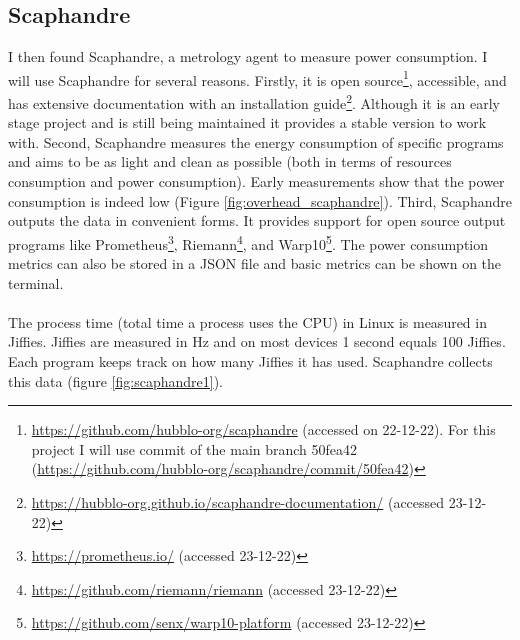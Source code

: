 \documentclass[../thesis.tex]{subfiles}
\begin{document}
\subsection{Scaphandre}
I then found Scaphandre, a metrology agent to measure power consumption. I will use Scaphandre for several reasons. Firstly, it is open source\footnote{\url{https://github.com/hubblo-org/scaphandre} (accessed on 22-12-22). For this project I will use commit of the main branch 50fea42 (\url{https://github.com/hubblo-org/scaphandre/commit/50fea42})}, accessible, and has extensive documentation with an installation guide\footnote{\url{https://hubblo-org.github.io/scaphandre-documentation/} (accessed 23-12-22)}. Although it is an early stage project and is still being maintained it provides a stable version to work with. Second, Scaphandre measures the energy consumption of specific programs and aims to be as light and clean as possible (both in terms of resources consumption and power consumption). Early measurements show that the power consumption is indeed low (Figure \ref{fig:overhead_scaphandre}). Third, Scaphandre outputs the data in convenient forms. It provides support for open source output programs like Prometheus\footnote{\url{https://prometheus.io/} (accessed 23-12-22)}, Riemann\footnote{\url{https://github.com/riemann/riemann} (accessed 23-12-22)}, and Warp10\footnote{\url{https://github.com/senx/warp10-platform} (accessed 23-12-22)}. The power consumption metrics can also be stored in a JSON file and basic metrics can be shown on the terminal. \paragraph{}

The process time (total time a process uses the CPU) in Linux is measured in Jiffies. Jiffies are measured in Hz and on most devices 1 second equals 100 Jiffies. Each program keeps track on how many Jiffies it has used. Scaphandre collects this data (figure \ref{fig:scaphandre1}).
\end{document}
